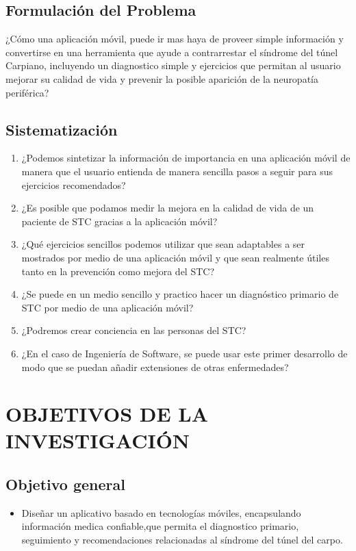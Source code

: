 \documentclass[a4paper,man,natbib]{apa6}
\begin{document}
\subsection{Formulación del Problema}

¿Cómo una aplicación móvil, puede ir mas haya de proveer simple información y convertirse en una herramienta que ayude a contrarrestar el síndrome del túnel Carpiano, incluyendo un diagnostico simple y ejercicios que permitan al usuario mejorar su calidad de vida y prevenir la posible aparición de la neuropatía periférica?

\subsection{Sistematización}
\begin{enumerate}
\item ¿Podemos sintetizar la información de importancia en una aplicación móvil de manera que el usuario entienda de manera sencilla pasos a seguir para sus ejercicios recomendados?
\item ¿Es posible que podamos medir la mejora en la calidad de vida de un paciente de STC gracias a la aplicación móvil?
\item ¿Qué ejercicios sencillos podemos utilizar que sean adaptables a ser mostrados por medio de una aplicación móvil y que sean realmente útiles tanto en la prevención como mejora del STC?
\item ¿Se puede en un medio sencillo y practico hacer un diagnóstico primario de STC por medio de una aplicación móvil?
\item ¿Podremos crear conciencia en las personas del STC?

\item ¿En el caso de Ingeniería de Software, se puede usar este primer desarrollo de modo que se puedan añadir extensiones de otras enfermedades?
\end{enumerate}

\section{OBJETIVOS DE LA INVESTIGACIÓN}
\subsection{Objetivo general}

\begin{itemize}
\item Diseñar un aplicativo basado en tecnologías móviles, encapsulando información medica confiable,que permita el diagnostico primario, seguimiento y recomendaciones relacionadas al síndrome del túnel del carpo.
\end{itemize}
\end{document}
